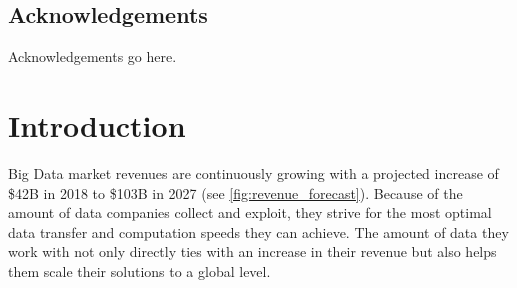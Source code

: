 \documentclass[bsc,frontabs,twoside,singlespacing,parskip,deptreport,hidel]{infthesis}     %
\begin{document}
\maketitle

\section*{Acknowledgements}
Acknowledgements go here. 

\tableofcontents


\chapter{Introduction}

Big Data market revenues are continuously growing with a projected increase of \$42B in 2018 to \$103B in 2027 \cite{statista_market_forecast:online} (see \autoref{fig:revenue_forecast}). Because of the amount of data companies collect and exploit, they strive for the most optimal data transfer and computation speeds they can achieve. The amount of data they work with not only directly ties with an increase in their revenue but also helps them scale their solutions to a global level. 
\end{document}
